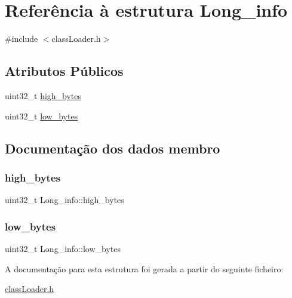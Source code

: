 \hypertarget{struct_long__info}{}\section{Referência à estrutura Long\+\_\+info}
\label{struct_long__info}


{\ttfamily \#include $<$class\+Loader.\+h$>$}

\subsection*{Atributos Públicos}
\begin{DoxyCompactItemize}
\item 
uint32\+\_\+t \hyperlink{struct_long__info_a961d16bc5baa1b31ecc9e97e489cf40b}{high\+\_\+bytes}
\item 
uint32\+\_\+t \hyperlink{struct_long__info_a4a9e297eae594d0314d7843436185387}{low\+\_\+bytes}
\end{DoxyCompactItemize}


\subsection{Documentação dos dados membro}
\hypertarget{struct_long__info_a961d16bc5baa1b31ecc9e97e489cf40b}{}\label{struct_long__info_a961d16bc5baa1b31ecc9e97e489cf40b} 
\subsubsection{\texorpdfstring{high\+\_\+bytes}{high\_bytes}}
{\footnotesize\ttfamily uint32\+\_\+t Long\+\_\+info\+::high\+\_\+bytes}

\hypertarget{struct_long__info_a4a9e297eae594d0314d7843436185387}{}\label{struct_long__info_a4a9e297eae594d0314d7843436185387} 
\subsubsection{\texorpdfstring{low\+\_\+bytes}{low\_bytes}}
{\footnotesize\ttfamily uint32\+\_\+t Long\+\_\+info\+::low\+\_\+bytes}



A documentação para esta estrutura foi gerada a partir do seguinte ficheiro\+:\begin{DoxyCompactItemize}
\item 
\hyperlink{class_loader_8h}{class\+Loader.\+h}\end{DoxyCompactItemize}
